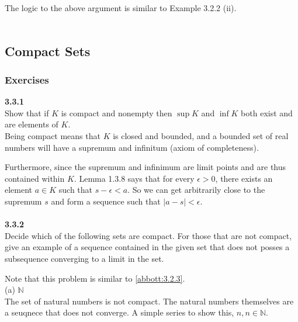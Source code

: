 The logic to the above argument is similar to Example 3.2.2 (ii).
\\~\\







\subsection{Compact Sets}


\subsubsection{Exercises}


\textbf{3.3.1}
\\

Show that if $K$ is compact and nonempty then $\sup K$ and $\inf K$ both exist and are elements of $K$.
\\

Being compact means that $K$ is closed and bounded, and a bounded set of real numbers will have a supremum and infinitum
(axiom of completeness).

Furthermore, since the supremum and infinimum are limit points and are thus contained within $K$.
Lemma 1.3.8 says that for every $\epsilon > 0$, there exists an element $a\in K$ such that $s - \epsilon < a$.
So we can get arbitrarily close to the supremum $s$ and form a sequence such that $|a - s| < \epsilon$.
\\~\\



\label{abbott:3.3.2}
\textbf{3.3.2}
\\

Decide which of the following sets are compact.
For those that are not compact, give an example of a sequence contained in the given set that does not posses
a subsequence converging to a limit in the set.

Note that this problem is similar to \ref{abbott:3.2.3}.
\\

(a) $\mathbb{N}$
\\

The set of natural numbers is not compact.
The natural numbers themselves are a seuqnece that does not converge.
A simple series to show this, $n, n\in\mathbb{N}$.
\\

